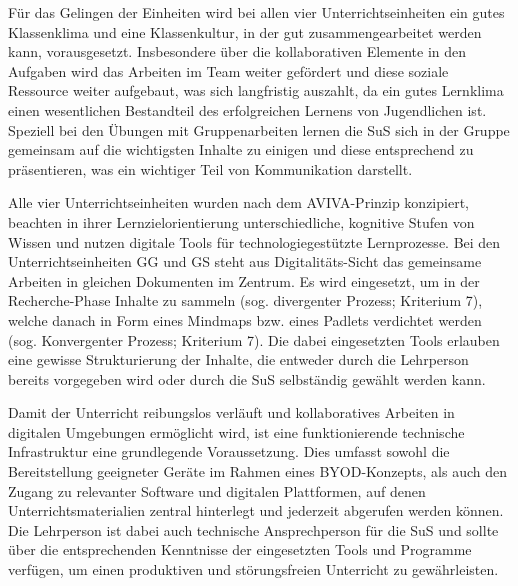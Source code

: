 Für das Gelingen der Einheiten wird bei allen vier Unterrichtseinheiten ein gutes Klassenklima und eine Klassenkultur, in der gut zusammengearbeitet werden kann, vorausgesetzt. Insbesondere über die kollaborativen Elemente in den Aufgaben wird das Arbeiten im Team weiter gefördert und diese soziale Ressource weiter aufgebaut, was sich langfristig auszahlt, da ein gutes Lernklima einen wesentlichen Bestandteil des erfolgreichen Lernens von Jugendlichen ist. Speziell bei den Übungen mit Gruppenarbeiten lernen die SuS sich in der Gruppe gemeinsam auf die wichtigsten Inhalte zu einigen und diese entsprechend zu präsentieren, was ein wichtiger Teil von Kommunikation darstellt. 

Alle vier Unterrichtseinheiten wurden nach dem AVIVA-Prinzip konzipiert, beachten in ihrer Lernzielorientierung unterschiedliche, kognitive Stufen von Wissen und nutzen digitale Tools für technologiegestützte Lernprozesse. Bei den Unterrichtseinheiten GG und GS steht aus Digitalitäts-Sicht das gemeinsame Arbeiten in gleichen Dokumenten im Zentrum. Es wird eingesetzt, um in der Recherche-Phase Inhalte zu sammeln (sog. divergenter Prozess; Kriterium 7), welche danach in Form eines Mindmaps bzw. eines Padlets verdichtet werden (sog. Konvergenter Prozess; Kriterium 7). Die dabei eingesetzten Tools erlauben eine gewisse Strukturierung der Inhalte, die entweder durch die Lehrperson bereits vorgegeben wird oder durch die SuS selbständig gewählt werden kann. 

Damit der Unterricht reibungslos verläuft und kollaboratives Arbeiten in digitalen Umgebungen ermöglicht wird, ist eine funktionierende technische Infrastruktur eine grundlegende Voraussetzung. Dies umfasst sowohl die Bereitstellung geeigneter Geräte im Rahmen eines BYOD-Konzepts, als auch den Zugang zu relevanter Software und digitalen Plattformen, auf denen Unterrichtsmaterialien zentral hinterlegt und jederzeit abgerufen werden können. 
Die Lehrperson ist dabei auch technische Ansprechperson für die SuS und sollte über die entsprechenden Kenntnisse der eingesetzten Tools und Programme verfügen, um einen produktiven und störungsfreien Unterricht zu gewährleisten. 

